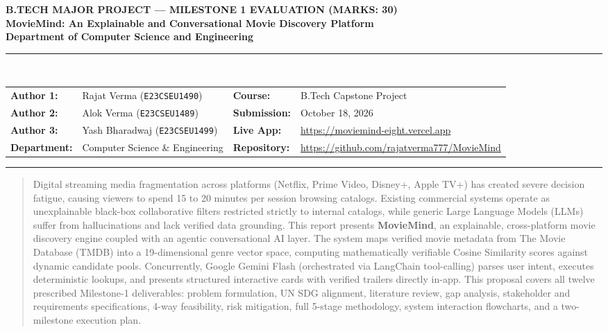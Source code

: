 \documentclass[11pt,a4paper]{article}
\begin{document}
\begin{center}
    {\large \textbf{\textcolor{accentblue}{B.TECH MAJOR PROJECT --- MILESTONE 1 EVALUATION (MARKS: 30)}}}\\[0.35cm]
    {\LARGE \textbf{\textcolor{primaryblue}{MovieMind: An Explainable and Conversational Movie Discovery Platform}}}\\[0.25cm]
    {\normalsize \textbf{Department of Computer Science and Engineering}}\\[0.2cm]
    \rule{\linewidth}{1.2pt}\\[0.3cm]
    
    \begin{tabularx}{\textwidth}{lX lX}
        \textbf{Author 1:} & Rajat Verma (\texttt{E23CSEU1490}) & \textbf{Course:} & B.Tech Capstone Project \\
        \textbf{Author 2:} & Alok Verma (\texttt{E23CSEU1489}) & \textbf{Submission:} & October 18, 2026 \\
        \textbf{Author 3:} & Yash Bharadwaj (\texttt{E23CSEU1499}) & \textbf{Live App:} & \url{https://moviemind-eight.vercel.app} \\
        \textbf{Department:} & Computer Science \& Engineering & \textbf{Repository:} & \url{https://github.com/rajatverma777/MovieMind} \\
    \end{tabularx}
    \rule{\linewidth}{0.6pt}
\end{center}

\vspace{0.15cm}

\begin{abstract}
Digital streaming media fragmentation across platforms (Netflix, Prime Video, Disney+, Apple TV+) has created severe decision fatigue, causing viewers to spend 15 to 20 minutes per session browsing catalogs. Existing commercial systems operate as unexplainable black-box collaborative filters restricted strictly to internal catalogs, while generic Large Language Models (LLMs) suffer from hallucinations and lack verified data grounding. This report presents \textbf{MovieMind}, an explainable, cross-platform movie discovery engine coupled with an agentic conversational AI layer. The system maps verified movie metadata from The Movie Database (TMDB) into a 19-dimensional genre vector space, computing mathematically verifiable Cosine Similarity scores against dynamic candidate pools. Concurrently, Google Gemini Flash (orchestrated via LangChain tool-calling) parses user intent, executes deterministic lookups, and presents structured interactive cards with verified trailers directly in-app. This proposal covers all twelve prescribed Milestone-1 deliverables: problem formulation, UN SDG alignment, literature review, gap analysis, stakeholder and requirements specifications, 4-way feasibility, risk mitigation, full 5-stage methodology, system interaction flowcharts, and a two-milestone execution plan.
\end{abstract}
\end{document}
